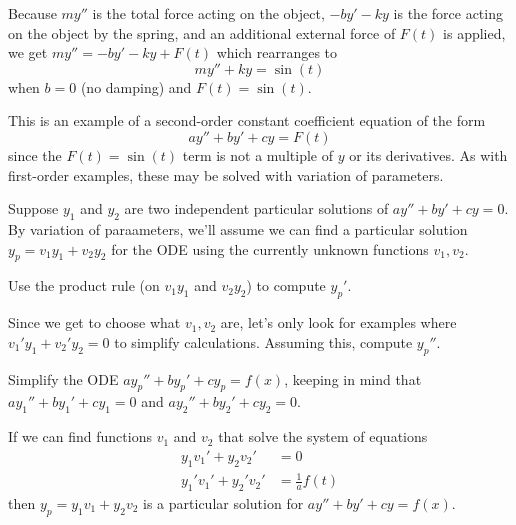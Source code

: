 \begin{applicationActivities}
\begin{observation}
Because \(my''\) is the total force acting on the object,
\(-by'-ky\) is the force acting on the object by the spring,
and an additional external force of \(F(t)\) is applied,
we get \(my''=-by'-ky+F(t)\) which rearranges to
\[my''+ky=\sin(t)\]
when \(b=0\) (no damping) and \(F(t)=\sin(t)\).

\vfill

This is an example of a  second-order constant coefficient
equation of the form
\[
ay''+by'+cy=F(t)
\] 
since the \(F(t)=\sin(t)\) term is not a multiple of \(y\) or its derivatives.
As with first-order examples, these may be solved with variation of parameters.
\end{observation}

\begin{activity}{15}
Suppose \(y_1\) and \(y_2\) are two independent particular solutions of 
\(ay''+by'+cy=0\).  
\vfill
By variation of paraameters, we'll assume we can find a particular
solution \(y_p = v_1 y_1 + v_2 y_2\) for the ODE using
the currently unknown functions \(v_1,v_2\).
\vfill
\begin{subactivity}
Use the product rule (on \(v_1y_1\) and \(v_2y_2\)) to compute \(y_p'\).
\end{subactivity}

\begin{subactivity} 
Since we get to choose what \(v_1,v_2\) are, let's only look for examples
where \(v_1'y_1+v_2'y_2=0\) to simplify calculations.
Assuming this, compute \(y_p''\).
\end{subactivity}

\begin{subactivity}
Simplify the ODE \(ay_p''+by_p'+cy_p=f(x)\), keeping in mind that
\(ay_1''+by_1'+cy_1=0\) and \(ay_2''+by_2'+cy_2=0\).
\end{subactivity}
\vfill
\end{activity}

\begin{observation}
If we can find functions \(v_1\) and \(v_2\) that solve the
system of equations
\begin{alignat*}{2}
y_1 v_1' + y_2 v_2'&=0 \\
y_1' v_1' + y_2' v_2'&=\frac{1}{a}f(t)
\end{alignat*}
then \(y_p=y_1v_1+y_2v_2\) is a particular
solution for \(ay''+by'+cy=f(x)\).  
\end{observation}


\end{applicationActivities}
